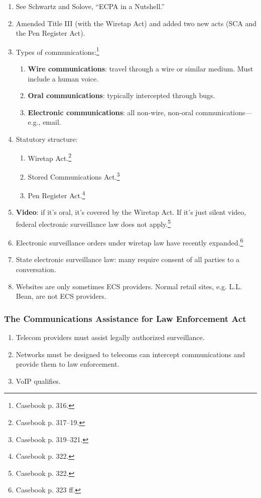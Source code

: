 \begin{enumerate}
    \item See Schwartz and Solove, ``ECPA in a Nutshell.''
    \item Amended Title III (with the Wiretap Act) and added two new acts (SCA 
    and the Pen Register Act).
    \item Types of communications:\footnote{Casebook p. 316.}
    \begin{enumerate}
        \item \textbf{Wire communications}: travel through a wire or similar 
        medium. Must include a human voice.
        \item \textbf{Oral communications}: typically intercepted through 
        bugs.
        \item \textbf{Electronic communications}: all non-wire, non-oral 
        communications---e.g., email. 
    \end{enumerate}
    \item Statutory structure:
    \begin{enumerate}
        \item Wiretap Act.\footnote{Casebook p. 317--19.}
        \item Stored Communications Act.\footnote{Casebook p. 319--321.}
        \item Pen Register Act.\footnote{Casebook p. 322.}
    \end{enumerate}
    \item \textbf{Video}: if it's oral, it's covered by the Wiretap Act. If 
    it's just silent video, federal electronic surveillance law does not 
    apply.\footnote{Casebook p. 322.}
    \item Electronic surveillance orders under wiretap law have recently 
    expanded.\footnote{Casebook p. 323 ff.}
    \item State electronic surveillance law: many require consent of all 
    parties to a conversation.
    \item Websites are only sometimes ECS providers. Normal retail sites, e.g. 
    L.L. Bean, are not ECS providers.
\end{enumerate}

\subsubsection{The Communications Assistance for Law Enforcement Act}

\begin{enumerate}
    \item Telecom providers must assist legally authorized surveillance.
    \item Networks must be designed to telecoms can intercept communications 
    and provide them to law enforcement.
    \item VoIP qualifies.
\end{enumerate}

